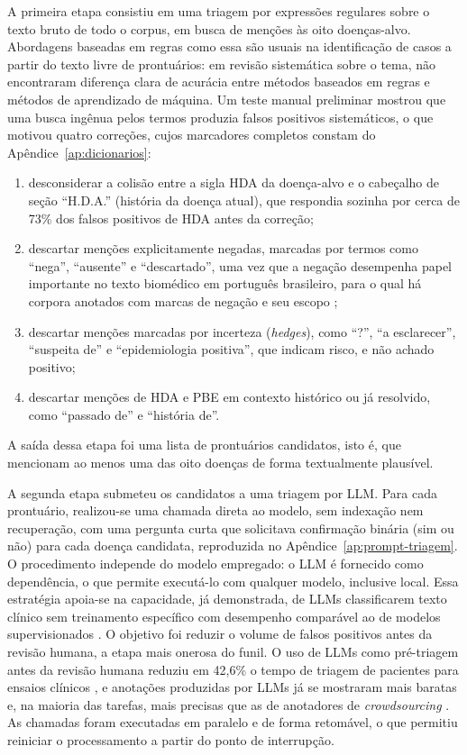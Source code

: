 A primeira etapa consistiu em uma triagem por expressões regulares sobre o texto bruto de todo o corpus, em busca de menções às oito doenças-alvo. Abordagens baseadas em regras como essa são usuais na identificação de casos a partir do texto livre de prontuários: em revisão sistemática sobre o tema, \citet{ford2016} não encontraram diferença clara de acurácia entre métodos baseados em regras e métodos de aprendizado de máquina. Um teste manual preliminar mostrou que uma busca ingênua pelos termos produzia falsos positivos sistemáticos, o que motivou quatro correções, cujos marcadores completos constam do Apêndice~\ref{ap:dicionarios}:
\begin{enumerate}
    \item desconsiderar a colisão entre a sigla HDA da doença-alvo e o cabeçalho de seção ``H.D.A.'' (história da doença atual), que respondia sozinha por cerca de 73\% dos falsos positivos de HDA antes da correção;
    \item descartar menções explicitamente negadas, marcadas por termos como ``nega'', ``ausente'' e ``descartado'', uma vez que a negação desempenha papel importante no texto biomédico em português brasileiro, para o qual há corpora anotados com marcas de negação e seu escopo \citep{dalloux2021};
    \item descartar menções marcadas por incerteza (\textit{hedges}), como ``?'', ``a esclarecer'', ``suspeita de'' e ``epidemiologia positiva'', que indicam risco, e não achado positivo;
    \item descartar menções de HDA e PBE em contexto histórico ou já resolvido, como ``passado de'' e ``história de''.
\end{enumerate}
A saída dessa etapa foi uma lista de prontuários candidatos, isto é, que mencionam ao menos uma das oito doenças de forma textualmente plausível.

A segunda etapa submeteu os candidatos a uma triagem por LLM. Para cada prontuário, realizou-se uma chamada direta ao modelo, sem indexação nem recuperação, com uma pergunta curta que solicitava confirmação binária (sim ou não) para cada doença candidata, reproduzida no Apêndice~\ref{ap:prompt-triagem}. O procedimento independe do modelo empregado: o LLM é fornecido como dependência, o que permite executá-lo com qualquer modelo, inclusive local. Essa estratégia apoia-se na capacidade, já demonstrada, de LLMs classificarem texto clínico sem treinamento específico com desempenho comparável ao de modelos supervisionados \citep{sushil2024}. O objetivo foi reduzir o volume de falsos positivos antes da revisão humana, a etapa mais onerosa do funil. O uso de LLMs como pré-triagem antes da revisão humana reduziu em 42,6\% o tempo de triagem de pacientes para ensaios clínicos \citep{jin2024}, e anotações produzidas por LLMs já se mostraram mais baratas e, na maioria das tarefas, mais precisas que as de anotadores de \textit{crowdsourcing} \citep{gilardi2023}. As chamadas foram executadas em paralelo e de forma retomável, o que permitiu reiniciar o processamento a partir do ponto de interrupção.

